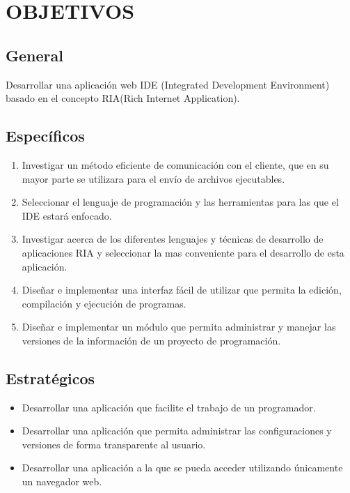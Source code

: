 \section{OBJETIVOS}

\subsection{General}
\label{objetive:general}
Desarrollar una aplicación web IDE (Integrated Development Environment) basado en el concepto RIA(Rich Internet Application).

\subsection{Específicos}

\label{objetive:especifics}
\begin{enumerate}
	
	\item Investigar un método eficiente de comunicación con el cliente, que en su mayor parte se utilizara para el envío de archivos ejecutables.
	
	\item Seleccionar el lenguaje de programación y las herramientas para las que el IDE estará enfocado.
	
	\item Investigar acerca de los diferentes lenguajes y técnicas de desarrollo de aplicaciones RIA y seleccionar la mas conveniente para el desarrollo de esta aplicación.
	
	\item Diseñar e implementar una interfaz fácil de utilizar que permita la edición, compilación y ejecución de programas.
	
	\item Diseñar e implementar un módulo que permita administrar y manejar las versiones de la información de un proyecto de programación.
	
\end{enumerate}


\subsection{Estratégicos}

\begin{itemize}

	\item Desarrollar una aplicación que facilite el trabajo de un programador.
	
	\item Desarrollar una aplicación que permita administrar las configuraciones y versiones de forma transparente al usuario.
	
	\item Desarrollar una aplicación a la que se pueda acceder utilizando únicamente un navegador web.
	
\end{itemize}
